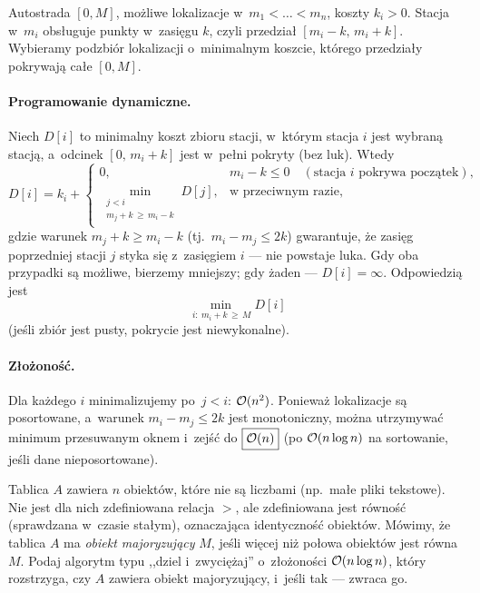 Autostrada $[0,M]$, możliwe lokalizacje w~$m_1<\dots<m_n$, koszty $k_i>0$.
Stacja w~$m_i$ obsługuje punkty w~zasięgu $k$, czyli przedział $[m_i-k,\,m_i+k]$.
Wybieramy podzbiór lokalizacji o~minimalnym koszcie, którego przedziały pokrywają
całe $[0,M]$.

\paragraph{Programowanie dynamiczne.}
Niech $D[i]$ to minimalny koszt zbioru stacji, w~którym stacja $i$ jest
 wybraną stacją, a~odcinek $[0,\,m_i+k]$ jest w~pełni
pokryty (bez luk). Wtedy
\[
	D[i]=k_i+
	\begin{cases}
		0, & m_i-k\leq 0 \quad(\text{stacja $i$ pokrywa początek}),\\[2pt]
		\displaystyle\min_{\substack{j<i\\ m_j+k\,\geq\, m_i-k}} D[j], & \text{w~przeciwnym razie,}
	\end{cases}
\]
gdzie warunek $m_j+k\geq m_i-k$ (tj.\ $m_i-m_j\leq 2k$) gwarantuje, że zasięg
poprzedniej stacji $j$ styka się z~zasięgiem $i$ --- nie powstaje luka. Gdy oba
przypadki są możliwe, bierzemy mniejszy; gdy żaden --- $D[i]=\infty$.
Odpowiedzią jest
\[
	\min_{\,i:\ m_i+k\,\geq\, M} D[i]
\]
(jeśli zbiór jest pusty, pokrycie jest niewykonalne).

\paragraph{Złożoność.}
Dla każdego $i$ minimalizujemy po~$j<i$: $\mathcal{O}(n^2)$. Ponieważ lokalizacje są
posortowane, a~warunek $m_i-m_j\leq 2k$ jest monotoniczny, można utrzymywać
minimum przesuwanym oknem i~zejść do $\boxed{\mathcal{O}(n)}$ (po $\mathcal{O}(n\log n)$ na
sortowanie, jeśli dane nieposortowane).

\clearpage
\begin{zadanie}
	Tablica $A$ zawiera $n$ obiektów, które nie są liczbami (np.\ małe pliki
	tekstowe). Nie jest dla nich zdefiniowana relacja $>$, ale zdefiniowana jest
	równość (sprawdzana w~czasie stałym), oznaczająca identyczność obiektów.
	Mówimy, że tablica $A$ ma \emph{obiekt majoryzujący} $M$, jeśli więcej niż
	połowa obiektów jest równa $M$. Podaj algorytm typu ,,dziel i~zwyciężaj''
	o~złożoności $\mathcal{O}(n\log n)$, który rozstrzyga, czy $A$ zawiera obiekt
	majoryzujący, i~jeśli tak --- zwraca go.
\end{zadanie}


